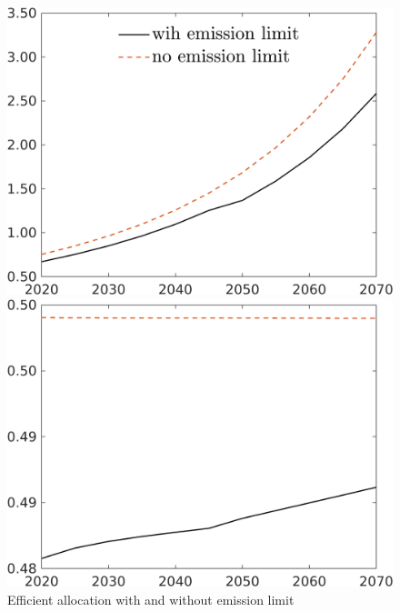 \begin{figure}[h!!]
	\centering
	\caption{Efficient allocation with and without emission limit }\label{fig:eff_with_notarget}
	\begin{minipage}[]{0.32\textwidth}
		\includegraphics[width=1\textwidth]{../../codding_model/own_basedOnFried/optimalPol_190722_tidiedUp/figures/all_10Aout22/C_TargetCompSP_T_regime3_spillover0_noskill0_sep1_xgrowth0_etaa0.79_lgd1.png}
	\end{minipage}
	\begin{minipage}[]{0.32\textwidth}
	\includegraphics[width=1\textwidth]{../../codding_model/own_basedOnFried/optimalPol_190722_tidiedUp/figures/all_10Aout22/hh_TargetCompSP_T_regime3_spillover0_noskill0_sep1_xgrowth0_etaa0.79_lgd0.png}

\end{minipage}
\end{figure}
